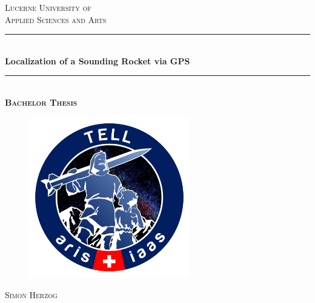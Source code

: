 
\begin{titlepage} %
	\newcommand{\HRule}{\rule{\linewidth}{0.5mm}} %
	
	\center %
	
	\textsc{\large Lucerne University of\\ Applied Sciences and Arts}\\[0.2cm] %
	
	
	\HRule\\[0.4cm]
	
	{\LARGE\bfseries Localization of a Sounding Rocket via GPS}\\[0.4cm] %
	
	\HRule\\[0.5cm]
	
	\large \textsc{\textbf{Bachelor Thesis}}\\[0.5cm] 
	
	\vfill
	
	\begin{figure}[!h]
	  \centering
	  \includegraphics[height=7cm]{images/Tell_Logo.png}
	\end{figure}
	
	\vfill
	
	\textsc{\normalsize Simon Herzog}\\[0.3cm]
	

\end{titlepage}
